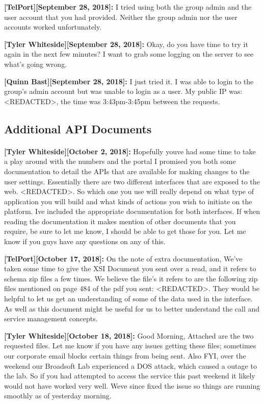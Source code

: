 \documentclass[12pt]{article}
\begin{document}
\textbf{[TelPort][September 28, 2018]:} I tried using both the group admin and the user account that you had provided. Neither the group admin nor the user accounts worked unfortunately.

\textbf{[Tyler Whiteside][September 28, 2018]:} Okay, do you have time to try it again in the next few minutes? I want to grab some logging on the server to see what's going wrong.

\textbf{[Quinn Bast][September 28, 2018]:} I just tried it. I was able to login to the group's admin account but was unable to login as a user. My public IP was: <REDACTED>, the time was 3:43pm-3:45pm between the requests.

\subsection{Additional API Documents}

\paragraph{}
\textbf{[Tyler Whiteside][October 2, 2018]:} Hopefully youve had some time to take a play around with the numbers and the portal I promised you both some documentation to detail the APIs that are available for making changes to the user settings.  Essentially there are two different interfaces that are exposed to the web. <REDACTED>. So which one you use will really depend on what type of application you will build and what kinds of actions you wish to initiate on the platform.  Ive included the appropriate documentation for both interfaces. If when reading the documentation it makes mention of other documents that you require, be sure to let me know, I should be able to get those for you. Let me know if you guys have any questions on any of this.

\textbf{[TelPort][October 17, 2018]:} On the note of extra documentation, We've taken some time to give the XSI Document you sent over a read, and it refers to schema zip files a few times. We believe the file's it refers to are the following zip files mentioned on page 484 of the pdf you sent: <REDACTED>. They would be helpful to let us get an understanding of some of the data used in the interface. As well as this document might be useful for us to better understand the call and service management concepts.

\textbf{[Tyler Whiteside][October 18, 2018]:} Good Morning, Attached are the two requested files. Let me know if you have any issues getting these files; sometimes our corporate email blocks certain things from being sent. Also FYI, over the weekend our Broadsoft Lab experienced a DOS attack, which caused a outage to the lab.  So if you had attempted to access the service this past weekend it likely would not have worked very well.  Weve since fixed the issue so things are running smoothly as of yesterday morning.
\end{document}
